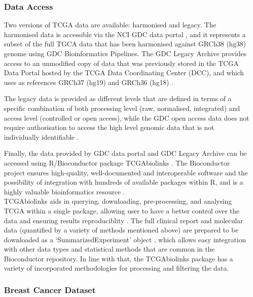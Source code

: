     \subsubsection{Data Access}

    Two versions of TCGA data are available: harmonised and legacy. The harmonised data is accessible via the NCI GDC data portal \cite{NCICommons}, and it represents a subset of the full TGCA data that has been harmonised against GRCh38 (hg38) genome using GDC Bioinformatics Pipelines. The GDC Legacy Archive provides access to an unmodified copy of data that was previously stored in the TCGA Data Portal hosted by the TCGA Data Coordinating Center (DCC), and  which uses as references GRCh37 (hg19) and GRCh36 (hg18) \cite{PapaleoTCGAPackages}.

    The legacy data is provided as different levels that are defined in terms of a specific combination of both processing level (raw, normalised, integrated) and access level (controlled or open access), while the GDC open access data does not require authorisation to access the high level genomic data that is not individually identifiable \cite{NCICommons, PapaleoTCGAPackages}.
    
    Finally, the data provided by GDC data portal and GDC Legacy Archive can be accessed using R/Bioconductor package TCGAbiolinks \cite{Colaprico2016}. The Bioconductor project ensures high-quality, well-documented and interoperable software and the possibility of integration with hundreds of available packages within R, and is a highly valuable bioinformatics resource \cite{gentleman2004bioconductor}. \\TCGAbiolinks aids in querying, downloading, pre-processing, and analysing TCGA within a single package, allowing user to have a better control over the data and ensuring results reproduciblity \cite{Colaprico2016}. The full clinical report and molecular data (quantified by a variety of methods mentioned above) are prepared to be downloaded as a ‘SummarizedExperiment’ object \cite{Huber2015OrchestratingBioconductor}, which allows easy integration with other data types and statistical methods that are common in the Bioconductor repository.  In line with that, the TCGAbiolinks package has a variety of incorporated methodologies for processing and filtering the data.  
    
    \newpage
    \subsubsection{Breast Cancer Dataset}
    
